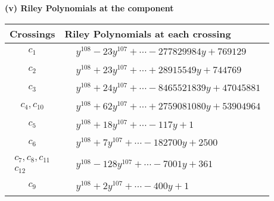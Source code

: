 \documentclass[1p]{elsarticle_modified}
\theoremstyle{definition}
\begin{document}
\newpage\renewcommand{\arraystretch}{1}
\flushleft \textbf{(v) Riley Polynomials at the component}\newline \\
\begin{tabular}{m{50pt}|m{274pt}}
Crossings & \hspace{64pt}Riley Polynomials at each crossing \\
\hline $$\begin{aligned}c_{1}\end{aligned}$$&$\begin{aligned}
&y^{108}-23 y^{107}+\cdots-277829984 y+769129
\end{aligned}$\\
\hline $$\begin{aligned}c_{2}\end{aligned}$$&$\begin{aligned}
&y^{108}+23 y^{107}+\cdots+28915549 y+744769
\end{aligned}$\\
\hline $$\begin{aligned}c_{3}\end{aligned}$$&$\begin{aligned}
&y^{108}+24 y^{107}+\cdots-8465521839 y+47045881
\end{aligned}$\\
\hline $$\begin{aligned}c_{4},c_{10}\end{aligned}$$&$\begin{aligned}
&y^{108}+62 y^{107}+\cdots+2759081080 y+53904964
\end{aligned}$\\
\hline $$\begin{aligned}c_{5}\end{aligned}$$&$\begin{aligned}
&y^{108}+18 y^{107}+\cdots-117 y+1
\end{aligned}$\\
\hline $$\begin{aligned}c_{6}\end{aligned}$$&$\begin{aligned}
&y^{108}+7 y^{107}+\cdots-182700 y+2500
\end{aligned}$\\
\hline $$\begin{aligned}c_{7},c_{8},c_{11}\\c_{12}\end{aligned}$$&$\begin{aligned}
&y^{108}-128 y^{107}+\cdots-7001 y+361
\end{aligned}$\\
\hline $$\begin{aligned}c_{9}\end{aligned}$$&$\begin{aligned}
&y^{108}+2 y^{107}+\cdots-400 y+1
\end{aligned}$\\
\hline
\end{tabular}\\~\\
\end{document}

